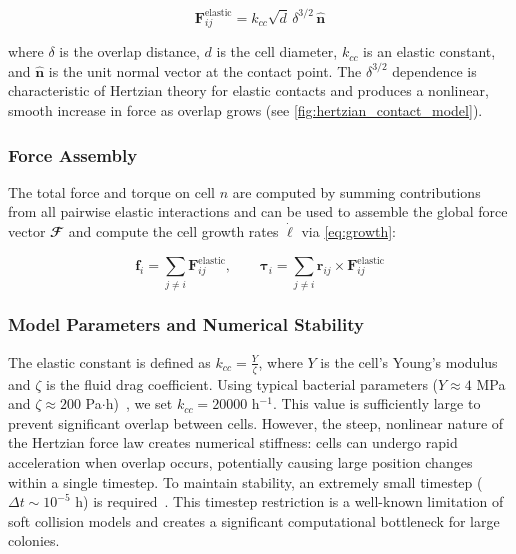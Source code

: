 \documentclass[conference]{IEEEtran}
\begin{document}
\begin{equation} \label{eq:hertzian_contact_model}
    \mathbf{F}^{\text{elastic}}_{ij} = k_{cc} \sqrt{d} \, \delta^{3/2} \, \hat{\mathbf{n}}
\end{equation}

where $\delta$ is the overlap distance, $d$ is the cell diameter, $k_{cc}$ is an elastic constant, and $\hat{\mathbf{n}}$ is the unit normal vector at the contact point. The $\delta^{3/2}$ dependence is characteristic of Hertzian theory for elastic contacts and produces a nonlinear, smooth increase in force as overlap grows (see \autoref{fig:hertzian_contact_model}).

\subsubsection{Force Assembly}

The total force and torque on cell $n$ are computed by summing contributions from all pairwise elastic interactions and can be used to assemble the global force vector $\mathbfcal{F}$ and compute the cell growth rates $\dot{\boldsymbol{\ell}}$ via \autoref{eq:growth}:

\begin{equation} \label{eq:force_assembly}
    \mathbf{f}_i         = \sum_{j \neq i} \mathbf{F}^{\text{elastic}}_{ij}, \qquad
    \boldsymbol{\tau}_i  = \sum_{j \neq i} \mathbf{r}_{ij} \times \mathbf{F}^{\text{elastic}}_{ij}
\end{equation}

\subsubsection{Model Parameters and Numerical Stability}

The elastic constant is defined as $k_{cc} = \frac{Y}{\zeta}$, where $Y$ is the cell's Young's modulus and $\zeta$ is the fluid drag coefficient. Using typical bacterial parameters ($Y \approx 4$ MPa and $\zeta \approx 200$ Pa$\cdot$h)~\cite{You2018, Blanchard2015}, we set $k_{cc} = 20000$ h$^{-1}$. This value is sufficiently large to prevent significant overlap between cells. However, the steep, nonlinear nature of the Hertzian force law creates numerical stiffness: cells can undergo rapid acceleration when overlap occurs, potentially causing large position changes within a single timestep. To maintain stability, an extremely small timestep ($\Delta t \sim 10^{-5}$ h) is required~\cite{Khan_2024, You2018, Blanchard2015}. This timestep restriction is a well-known limitation of soft collision models and creates a significant computational bottleneck for large colonies.
\end{document}
